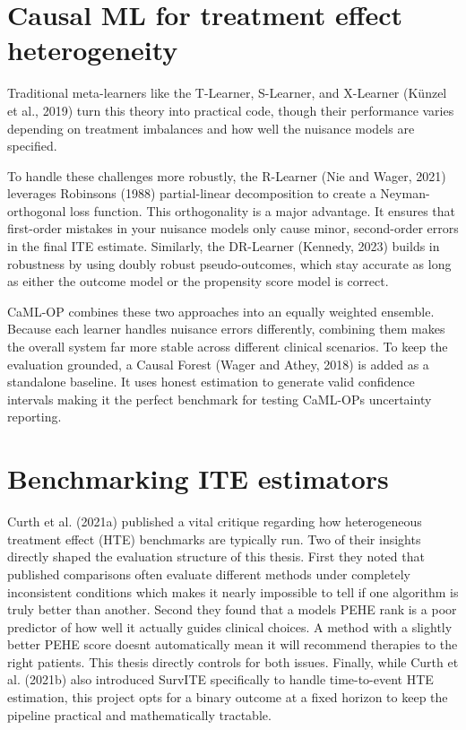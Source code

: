 \section{Causal ML for treatment effect heterogeneity}\label{causal-ml-for-treatment-effect-heterogeneity}

Traditional meta-learners like the T-Learner, S-Learner, and X-Learner (Künzel et al., 2019) turn this theory into practical code, though their performance varies depending on treatment imbalances and how well the nuisance models are specified.

To handle these challenges more robustly, the R-Learner (Nie and Wager, 2021) leverages Robinson\textquotesingle s (1988) partial-linear decomposition to create a Neyman-orthogonal loss function. This orthogonality is a major advantage. It ensures that first-order mistakes in your nuisance models only cause minor, second-order errors in the final ITE estimate. Similarly, the DR-Learner (Kennedy, 2023) builds in robustness by using doubly robust pseudo-outcomes, which stay accurate as long as either the outcome model or the propensity score model is correct.

CaML-OP combines these two approaches into an equally weighted ensemble. Because each learner handles nuisance errors differently, combining them makes the overall system far more stable across different clinical scenarios. To keep the evaluation grounded, a Causal Forest (Wager and Athey, 2018) is added as a standalone baseline. It uses honest estimation to generate valid confidence intervals making it the perfect benchmark for testing CaML-OP\textquotesingle s uncertainty reporting.

\section{Benchmarking ITE estimators}\label{benchmarking-ite-estimators}

Curth et al. (2021a) published a vital critique regarding how heterogeneous treatment effect (HTE) benchmarks are typically run. Two of their insights directly shaped the evaluation structure of this thesis. First they noted that published comparisons often evaluate different methods under completely inconsistent conditions which makes it nearly impossible to tell if one algorithm is truly better than another. Second they found that a model\textquotesingle s PEHE rank is a poor predictor of how well it actually guides clinical choices. A method with a slightly better PEHE score doesn\textquotesingle t automatically mean it will recommend therapies to the right patients. This thesis directly controls for both issues. Finally, while Curth et al. (2021b) also introduced SurvITE specifically to handle time-to-event HTE estimation, this project opts for a binary outcome at a fixed horizon to keep the pipeline practical and mathematically tractable.

